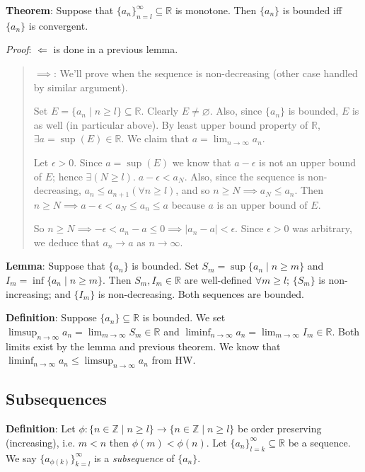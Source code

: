 \documentclass[11pt]{article}
\begin{document}
\textbf{Theorem}: Suppose that $\{a_n\}_{n=l}^\infty \subseteq \mathbb{R}$ is monotone. Then $\{a_n\}$ is bounded iff $\{a_n\}$ is convergent.

\emph{Proof}: $\Longleftarrow$ is done in a previous lemma.
\begin{quote}
$\implies$: We'll prove when the sequence is non-decreasing (other case handled by similar argument).

Set $E = \{a_n \;|\; n \geq l\} \subseteq \mathbb{R}$. Clearly $E \neq \varnothing$. Also, since $\{a_n\}$ is bounded, $E$ is as well (in particular above). By least upper bound property of $\mathbb{R}$, $\exists a = \sup(E) \in \mathbb{R}$. We claim that $a = \lim_{n \to \infty} a_n$.

Let $\epsilon > 0$. Since $a = \sup(E)$ we know that $a- \epsilon$ is not an upper bound of $E$; hence $\exists (N \geq l).\; a - \epsilon < a_N$. Also, since the sequence is non-decreasing, $a_n \leq a_{n+1} (\forall n \geq l)$, and so $n \geq N \implies a_N \leq a_n$. Then $n \geq N \implies a - \epsilon < a_N \leq a_n \leq a$ because $a$ is an upper bound of $E$.

So $n \geq N \implies -\epsilon < a_n - a \leq 0 \implies |a_n - a| < \epsilon$. Since $\epsilon > 0$ was arbitrary, we deduce that $a_n \to a$ as $n \to \infty$.
\end{quote}

\textbf{Lemma}: Suppose that $\{a_n\}$ is bounded. Set $S_m = \sup \{a_n \;|\; n \geq m\}$ and $I_m = \inf \{a_n \;|\; n \geq m\}$. Then $S_m, I_m \in \mathbb{R}$ are well-defined $\forall m \geq l$; $\{S_m\}$ is non-increasing; and $\{I_m\}$ is non-decreasing. Both sequences are bounded.

\textbf{Definition}: Suppose $\{a_n\} \subseteq \mathbb{R}$ is bounded. We set $\limsup_{n \to \infty} a_n = \lim_{m \to \infty} S_m \in \mathbb{R}$ and $\liminf_{n \to \infty} a_n = \lim_{m \to \infty} I_m \in \mathbb{R}$. Both limits exist by the lemma and previous theorem. We know that $\liminf_{n \to \infty} a_n \leq \limsup_{n \to \infty} a_n$ from HW.

\subsection{Subsequences}

\textbf{Definition}: Let $\phi: \{n \in \mathbb{Z} \;|\; n \geq l\} \to \{n \in \mathbb{Z}\;|\; n \geq l\}$ be order preserving (increasing), i.e. $m < n$ then $\phi(m) < \phi(n)$. Let $\{a_n\}_{l=k}^\infty \subseteq \mathbb{R}$ be a sequence. We say $\{a_{\phi(k)}\}_{k=l}^\infty$ is a \emph{subsequence} of $\{a_n\}$.
\end{document}
